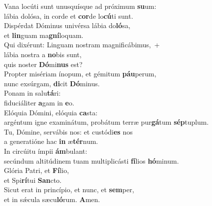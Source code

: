 \evenverse Vana locúti sunt unusquísque ad próximum \textbf{su}um:~\*\\
\evenverse lábia dolósa, in corde et \textbf{cor}de lo\textbf{cú}ti sunt.\\
\oddverse Dispérdat Dóminus univérsa lábia do\textbf{ló}sa,~\*\\
\oddverse et \textbf{lin}guam ma\textbf{gní}loquam.\\
\evenverse Qui dixérunt: Linguam nostram magnificábimus,~+\\
\evenverse  lábia nostra a \textbf{no}bis sunt,~\*\\
\evenverse quis noster \textbf{Dó}mi\textbf{nus} est?\\
\oddverse Propter misériam ínopum, et gémitum \textbf{páu}perum,~\*\\
\oddverse nunc exsúrgam, \textbf{di}cit \textbf{Dó}minus.\\
\evenverse Ponam in salu\textbf{tá}ri:~\*\\
\evenverse fiduciáliter \textbf{a}gam in \textbf{e}o.\\
\oddverse Elóquia Dómini, elóquia \textbf{ca}sta:~\*\\
\oddverse argéntum igne examinátum, probátum terræ pur\textbf{gá}tum \textbf{sép}tuplum.\\
\evenverse Tu, Dómine, servábis nos: et custódi\textbf{es} nos~\*\\
\evenverse a generatióne hac \textbf{in} æ\textbf{tér}num.\\
\oddverse In circúitu ímpii \textbf{ám}bulant:~\*\\
\oddverse secúndum altitúdinem tuam multiplicásti \textbf{fí}lios \textbf{hó}minum.\\
\evenverse Glória Patri, et \textbf{Fí}lio,~\*\\
\evenverse et Spi\textbf{rí}tui \textbf{San}cto.\\
\oddverse Sicut erat in princípio, et nunc, et \textbf{sem}per,~\*\\
\oddverse et in sǽcula sæcu\textbf{ló}rum. \textbf{A}men.\\
